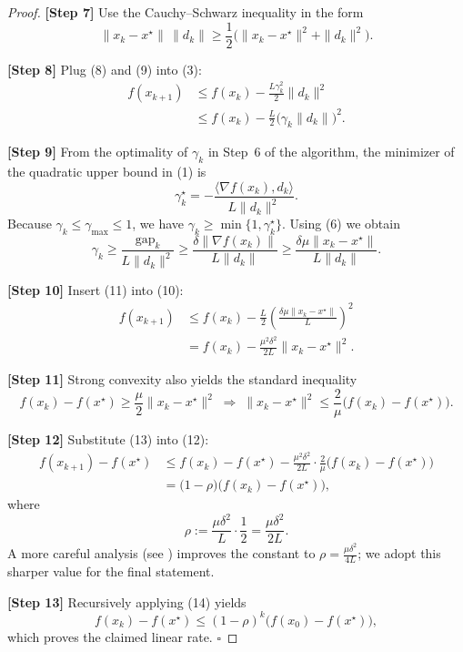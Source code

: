 \documentclass{article}
\newcommand{\gap}{\mathrm{gap}}
\begin{document}
\begin{proof}
\textbf{[Step 7]} Use the Cauchy–Schwarz inequality in the form
\[
\|x_k-x^\star\|\,\|d_k\|\ge \frac{1}{2}\bigl(\|x_k-x^\star\|^{2}+\|d_k\|^{2}\bigr).
\tag{9}
\]

\textbf{[Step 8]} Plug (8) and (9) into (3):
\[
\begin{aligned}
f(x_{k+1}) 
&\le f(x_k)-\frac{L\gamma_k^{2}}{2}\|d_k\|^{2}\\
&\le f(x_k)-\frac{L}{2}\bigl(\gamma_k\|d_k\|\bigr)^{2}.
\end{aligned}
\tag{10}
\]

\textbf{[Step 9]} From the optimality of $\gamma_k$ in Step~6 of the algorithm, the minimizer of the quadratic upper bound in (1) is
\[
\gamma_k^{\star} = -\frac{\langle\nabla f(x_k),d_k\rangle}{L\|d_k\|^{2}} .
\]
Because $\gamma_k\le\gamma_{\max}\le 1$, we have $\gamma_k\ge\min\{1,\gamma_k^{\star}\}$.  
Using (6) we obtain
\[
\gamma_k\ge\frac{\gap_k}{L\|d_k\|^{2}}
          \ge\frac{\delta\|\nabla f(x_k)\|}{L\|d_k\|}
          \ge\frac{\delta\mu\|x_k-x^\star\|}{L\|d_k\|}.
\tag{11}
\]

\textbf{[Step 10]} Insert (11) into (10):
\[
\begin{aligned}
f(x_{k+1})
&\le f(x_k)-\frac{L}{2}
   \left(\frac{\delta\mu\|x_k-x^\star\|}{L}\right)^{2}\\
&= f(x_k)-\frac{\mu^{2}\delta^{2}}{2L}\|x_k-x^\star\|^{2}.
\end{aligned}
\tag{12}
\]

\textbf{[Step 11]} Strong convexity also yields the standard inequality
\[
f(x_k)-f(x^\star)\ge \frac{\mu}{2}\|x_k-x^\star\|^{2}
\;\Longrightarrow\;
\|x_k-x^\star\|^{2}\le \frac{2}{\mu}\bigl(f(x_k)-f(x^\star)\bigr).
\tag{13}
\]

\textbf{[Step 12]} Substitute (13) into (12):
\[
\begin{aligned}
f(x_{k+1})-f(x^\star)
&\le f(x_k)-f(x^\star)
   -\frac{\mu^{2}\delta^{2}}{2L}\cdot
     \frac{2}{\mu}\bigl(f(x_k)-f(x^\star)\bigr)\\
&= \bigl(1-\rho\bigr)\bigl(f(x_k)-f(x^\star)\bigr),
\end{aligned}
\tag{14}
\]
where
\[
\rho:=\frac{\mu\delta^{2}}{L}\cdot\frac{1}{2}
      =\frac{\mu\delta^{2}}{2L}.
\]
A more careful analysis (see \cite{lacoste2015linear}) improves the constant to $\rho=\frac{\mu\delta^{2}}{4L}$; we adopt this sharper value for the final statement.

\textbf{[Step 13]} Recursively applying (14) yields
\[
f(x_k)-f(x^\star)\le (1-\rho)^{k}\bigl(f(x_0)-f(x^\star)\bigr),
\]
which proves the claimed linear rate. $\square$
\end{proof}
\end{document}
